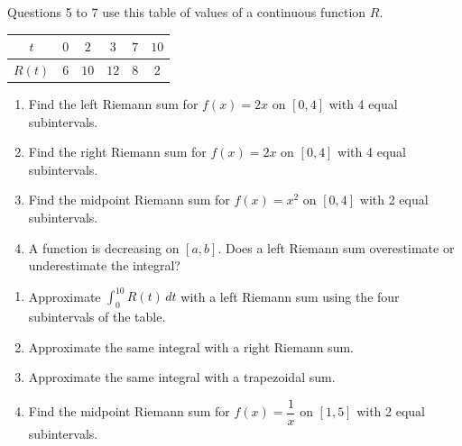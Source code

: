 \documentclass[11pt]{article}
\begin{document}
\newpage
{}
Questions 5 to 7 use this table of values of a continuous function $R$.\begin{center}\renewcommand{\arraystretch}{1.25}\begin{tabular}{|c|c|c|c|c|c|}\hline $t$ & $0$ & $2$ & $3$ & $7$ & $10$ \\ \hline $R(t)$ & $6$ & $10$ & $12$ & $8$ & $2$ \\ \hline\end{tabular}\end{center}
\begin{enumerate}[leftmargin=*,itemsep=2pt]
  \item Find the left Riemann sum for $f(x)=2x$ on $[0,4]$ with 4 equal subintervals.\work{2.3cm}
  \item Find the right Riemann sum for $f(x)=2x$ on $[0,4]$ with 4 equal subintervals.\work{2.3cm}
  \item Find the midpoint Riemann sum for $f(x)=x^2$ on $[0,4]$ with 2 equal subintervals.\work{2.3cm}
  \item A function is decreasing on $[a,b]$. Does a left Riemann sum overestimate or underestimate the integral?\work{2.3cm}
\end{enumerate}

\begin{enumerate}[leftmargin=*,itemsep=2pt,start=5]
  \item Approximate $\displaystyle\int_{0}^{10}R(t)\,dt$ with a left Riemann sum using the four subintervals of the table.\work{2.8cm}
  \item Approximate the same integral with a right Riemann sum.\work{2.8cm}
  \item Approximate the same integral with a trapezoidal sum.\work{2.8cm}
  \item Find the midpoint Riemann sum for $f(x)=\dfrac1x$ on $[1,5]$ with 2 equal subintervals.\work{2.8cm}
\end{enumerate}
\end{document}
